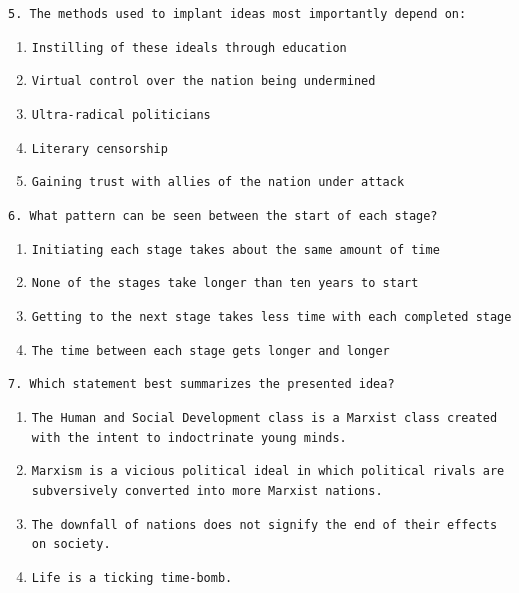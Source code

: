 \documentclass[11pt]{scrartcl} %
\begin{document}
\texttt{5. The methods used to implant ideas most importantly depend on:}

\begin{enumerate}[label=\texttt{\textbf{\alph*)}}]
\item \texttt{Instilling of these ideals through education}
\item \texttt{Virtual control over the nation being undermined}
\item \texttt{Ultra-radical politicians}
\item \texttt{Literary censorship}
\item \texttt{Gaining trust with allies of the nation under attack}
\end{enumerate}


\texttt{6. What pattern can be seen between the start of each stage?}

\begin{enumerate}[label=\texttt{\textbf{\alph*)}}]
\item \texttt{Initiating each stage takes about the same amount of time}
\item \texttt{None of the stages take longer than ten years to start}
\item \texttt{Getting to the next stage takes less time with each completed stage}
\item \texttt{The time between each stage gets longer and longer}
\end{enumerate}


\texttt{7. Which statement best summarizes the presented idea?}

\begin{enumerate}[label=\texttt{\textbf{\alph*)}}]
\item \texttt{The Human and Social Development class is a Marxist class created with the intent to indoctrinate young minds.}
\item \texttt{Marxism is a vicious political ideal in which political rivals are subversively converted into more Marxist nations.}
\item \texttt{The downfall of nations does not signify the end of their effects on society.}
\item \texttt{Life is a ticking time-bomb.}
\end{enumerate}
\end{document}
